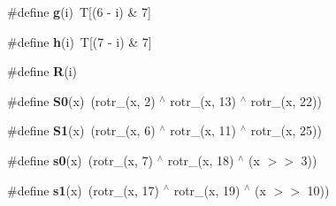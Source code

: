 \begin{DoxyCompactItemize}
\item 
\#define {\bfseries g}(i)~T[(6 -\/ i) \& 7]\label{sha256_8c_a9608045402267746965fa49d90bbada4}

\item 
\#define {\bfseries h}(i)~T[(7 -\/ i) \& 7]\label{sha256_8c_acf9942d15f0dd0ac4fc5ca66096a3f6d}

\item 
\#define {\bfseries R}(i)
\item 
\#define {\bfseries S0}(x)~(rotr\-\_(x, 2) $^\wedge$ rotr\-\_(x, 13) $^\wedge$ rotr\-\_(x, 22))\label{sha256_8c_a4fe3c738087e923a3174ad2a116e3be5}

\item 
\#define {\bfseries S1}(x)~(rotr\-\_(x, 6) $^\wedge$ rotr\-\_(x, 11) $^\wedge$ rotr\-\_(x, 25))\label{sha256_8c_a59c41bcd16cbf3247d426429c3bf8e08}

\item 
\#define {\bfseries s0}(x)~(rotr\-\_(x, 7) $^\wedge$ rotr\-\_(x, 18) $^\wedge$ (x $>$$>$ 3))\label{sha256_8c_aa4074fe219868f65efa393f656020fed}

\item 
\#define {\bfseries s1}(x)~(rotr\-\_(x, 17) $^\wedge$ rotr\-\_(x, 19) $^\wedge$ (x $>$$>$ 10))\label{sha256_8c_ac1e4ed4e56436a432900cad5a1225731}

\end{DoxyCompactItemize}
